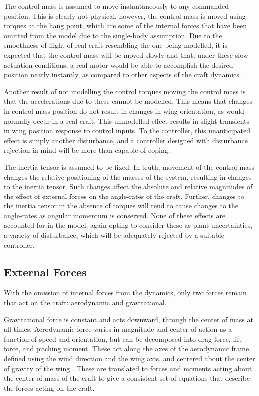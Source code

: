 \documentclass{sydeStyle}
\begin{document}
The control mass is assumed to move instantaneously to any commanded position.
This is clearly not physical, however, the control mass is moved using torques
at the hang point, which are some of the internal forces that have been omitted
from the model due to the single-body assumption. Due to the smoothness of
flight of real craft resembling the one being modelled, it is expected that the
control mass will be moved slowly and that, under these slow actuation
conditions, a real motor would be able to accomplish the desired position nearly
instantly, as compared to other aspects of the craft dynamics.

Another result of not modelling the control torques moving the control mass is
that the accelerations due to these cannot be modelled. This means that changes
in control mass position do not result in changes in wing orientation, as would
normally occur in a real craft. This unmodelled effect results in slight
transients in wing position response to control inputs. To the controller, this
unanticipated effect is simply another disturbance, and a controller designed
with disturbance rejection in mind will be more than capable of coping.

The inertia tensor is assumed to be fixed. In truth, movement of the control
mass changes the relative positioning of the masses of the system, resulting in
changes to the inertia tensor. Such changes affect the absolute and relative
magnitudes of the effect of external forces on the angle-rates of the craft.
Further, changes to the inertia tensor in the absence of torques will tend to
cause changes to the angle-rates as angular momentum is conserved. None of these
effects are accounted for in the model, again opting to consider these as plant
uncertainties, a variety of disturbance, which will be adequately rejected by a
suitable controller.

\subsection{External Forces}

With the omission of internal forces from the dynamics, only two forces remain
that act on the craft: aerodynamic and gravitational.

Gravitational force is constant and acts downward, through the center of mass at
all times. Aerodynamic force varies in magnitude and center of action as a
function of speed and orientation, but can be decomposed into drag force, lift
force, and pitching moment. These act along the axes of the aerodynamic frame,
defined using the wind direction and the wing axis, and centered about the
center of gravity of the wing \cite{etkin}. These are translated to forces and
moments acting about the center of mass of the craft to give a consistent set of
equations that describe the forces acting on the craft.
\end{document}
